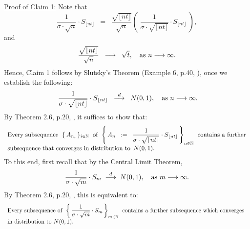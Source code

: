 \begin{enumerate}
		\vskip 0.5cm
		\noindent
		\underline{Proof of Claim 1:}\quad
		Note that
		\begin{equation*}
		\dfrac{1}{\sigma\cdot\sqrt{n}} \cdot S_{\lfloor nt \rfloor}
		\;\; = \;\;
		\dfrac{\sqrt{\lfloor nt \rfloor}}{\sqrt{n}} \left(\;\dfrac{1}{\sigma\cdot\sqrt{\lfloor nt \rfloor}} \cdot S_{\lfloor nt \rfloor}\;\right),
		\end{equation*}
		and
		\begin{equation*}
		\dfrac{\sqrt{\lfloor nt \rfloor}}{\sqrt{n}}
		\;\; \longrightarrow \;\; \sqrt{t},
		\quad
		\textnormal{as $n \longrightarrow \infty$}.
		\end{equation*}
		Hence, Claim 1 follows by Slutsky's Theorem (Example 6, p.40, \cite{Ferguson1996}),
		once we establish the following:
		\begin{equation*}
		\;\dfrac{1}{\sigma\cdot\sqrt{\lfloor nt \rfloor}} \cdot S_{\lfloor nt \rfloor}
		\;\; \overset{d}{\longrightarrow} \;\; N(0,1),
		\quad
		\textnormal{as $n \longrightarrow \infty$}.
		\end{equation*}
		By Theorem 2.6, p.20, \cite{Billingsley1999}, it suffices to show that:
		\begin{equation}\label{ClaimOneSubsequence}
		\begin{array}{l}
		\textnormal{Every subsequence \;$\{\,A_{n_{i}}\,\}_{i\in\mathbb{N}}$\; of
		\;$\left\{\,A_{n} \;\; := \;\; \dfrac{1}{\sigma\cdot\sqrt{\lfloor nt \rfloor}} \cdot S_{\lfloor nt \rfloor}\,\right\}_{n \in \mathbb{N}}$\;
		contains a further}
		\\
		\textnormal{subsequence that converges in distribution to \,$N(0,1)$.}
		\end{array}
		\end{equation}
		To this end, first recall that by the Central Limit Theorem,
		\begin{equation*}
		\dfrac{1}{\sigma\cdot\sqrt{m}}\cdot S_{m}
		\;\overset{d}{\longrightarrow}\;
		N(0,1),
		\quad
		\textnormal{as $m \longrightarrow \infty$}.
		\end{equation*}
		By Theorem 2.6, p.20, \cite{Billingsley1999}, this is equivalent to:
		\begin{equation}\label{CLTsubsequence}
		\begin{array}{l}
		\textnormal{Every
			subsequence of \;$\left\{\,\dfrac{1}{\sigma\cdot\sqrt{m}}\cdot S_{m}\,\right\}_{m\in\N}$\;
			contains a further subsequence which converges
			}
			\\
		\textnormal{in distribution to $N(0,1)$.}
		\end{array}

\end{equation}
\end{enumerate}
